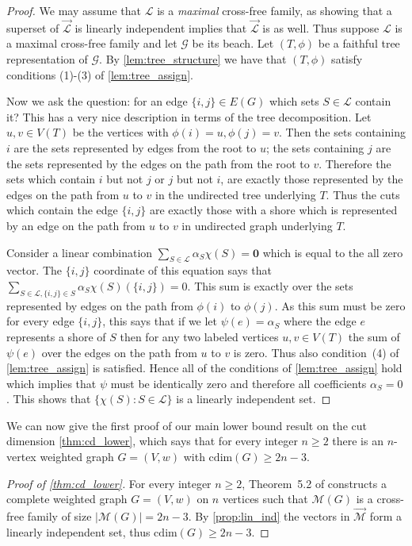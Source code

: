 \documentclass[10pt,a4paper]{article}
\newcommand{\zero}{\mathbf{0}}
\newcommand{\Lcal}{\mathcal{L}}
\newcommand{\Mcal}{\mathcal{M}}
\newcommand{\M}{\mathcal{M}}
\newcommand{\Gcal}{\mathcal{G}}
\newcommand{\cd}{\mathrm{cdim}}
\newcommand{\1}{\mathbf{1}}
\theoremstyle{definition}
\begin{document}
\begin{proof}
We may assume that $\Lcal$ is a \emph{maximal} cross-free family, as showing that a superset of $\vec{\Lcal}$ is linearly independent
implies that $\vec{\Lcal}$ is as well.  Thus suppose $\Lcal$ is a maximal cross-free family and let $\Gcal$ be its beach.  Let $(T,\phi)$ be a faithful tree representation of
$\Gcal$.  By \cref{lem:tree_structure} we have that $(T,\phi)$ satisfy conditions (1)-(3) of \cref{lem:tree_assign}.

Now we ask the question: for an edge $\{i,j\} \in E(G)$ which sets $S \in \Lcal$ contain it?
This has a very nice description in terms of the tree decomposition.  Let $u,v \in V(T)$ be the vertices with
$\phi(i) = u, \phi(j) = v$.  Then the sets containing $i$ are the sets represented by edges from the root to $u$;  the sets containing
$j$ are the sets represented by the edges on the path from the root to $v$.  Therefore the sets which contain $i$ but not $j$ or $j$ but
not $i$, are exactly those represented by the edges on the path from $u$ to $v$ in the undirected tree underlying $T$.  Thus the cuts which
contain the edge $\{i,j\}$ are exactly those with a shore which is represented by an edge on the path from $u$ to $v$ in undirected graph underlying $T$.

Consider a linear combination $\sum_{S \in \Lcal} \alpha_S \chi(S) = \zero$ which is equal to the all zero vector.  The $\{i,j\}$ coordinate
of this equation says that $\sum_{S \in \Lcal, \{i,j\} \in S} \alpha_S \chi(S)(\{i,j\}) = 0$.  This sum is exactly over the sets represented by edges
on the path from $\phi(i)$ to $\phi(j)$.  As this sum must be zero for every edge $\{i,j\}$, this says that if we let $\psi(e) = \alpha_S$ where the edge $e$
represents a shore of $S$ then for any two labeled vertices $u,v \in V(T)$ the sum of $\psi(e)$ over the edges on the path from $u$ to $v$ is zero.
Thus also condition~(4) of \cref{lem:tree_assign} is satisfied.
Hence all of the conditions of \cref{lem:tree_assign} hold which implies that
$\psi$ must be identically zero and therefore all coefficients $\alpha_S = 0$.  This shows that $\{\chi(S): S \in \Lcal\}$ is a linearly independent set.
\end{proof}

We can now give the first proof of our main lower bound result on the cut dimension \cref{thm:cd_lower}, which
says that for every integer $n\ge 2$ there is an $n$-vertex weighted graph $G = (V,w)$ with $\cd(G) \ge 2n-3$.

\begin{proof}[Proof of \cref{thm:cd_lower}]
For every integer $n \ge 2$, Theorem~5.2 of \cite{CR04} constructs a complete weighted graph $G = (V,w)$ on $n$ vertices such that
$\M(G)$ is a cross-free family of size $|\M(G)| = 2n-3$.  By \cref{prop:lin_ind} the vectors in $\vec{\Mcal}$ form a linearly
independent set, thus $\cd(G) \ge 2n-3$.
\end{proof}
\end{document}
